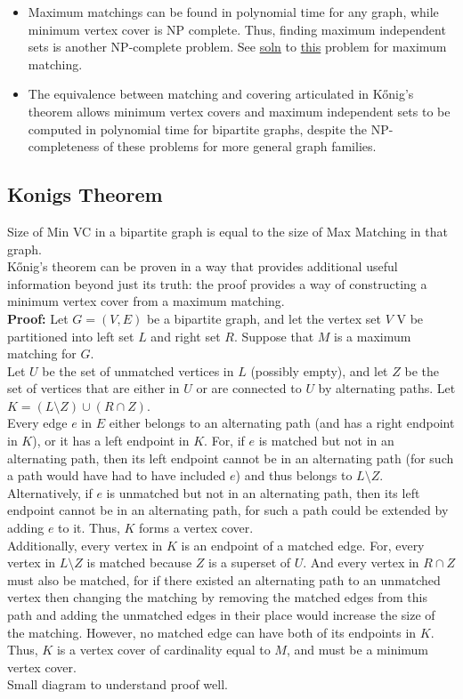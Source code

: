 \documentclass[8pt, a4paper, oneside, twocolumn]{extarticle}
\begin{document}
\begin{itemize}
    \item Maximum matchings can be found in polynomial time for any graph, while minimum vertex cover is NP complete. Thus, finding maximum independent sets is another NP-complete problem. See \href{https://github.com/sourabhxyz/Timus/blob/master/1099_Work_Scheduling.cpp}{soln} to \href{http://acm.timus.ru/problem.aspx?space=1&num=1099}{this} problem for maximum matching.
    \item The equivalence between matching and covering articulated in Kőnig's theorem allows minimum vertex covers and maximum independent sets to be computed in polynomial time for bipartite graphs, despite the NP-completeness of these problems for more general graph families.
\end{itemize}
\subsection{Konigs Theorem}
Size of Min VC in a bipartite graph is equal to the size of Max Matching in that graph.
\\Kőnig's theorem can be proven in a way that provides additional useful information beyond just its truth: the proof provides a way of constructing a minimum vertex cover from a maximum matching.
\\\textbf{Proof: } Let $G = (V, E)$ be a bipartite graph, and let the vertex set $V$ V be partitioned into left set $L$ and right set $R$. Suppose that $M$ is a maximum matching for $G$.
\\Let $U$ be the set of unmatched vertices in $L$ (possibly empty), and let $Z$ be the set of vertices that are either in $U$ or are connected to $U$ by alternating paths. Let $K = ( L \setminus Z ) \cup ( R \cap Z )$. 
\\Every edge $e$ in $E$ either belongs to an alternating path (and has a right endpoint in $K$), or it has a left endpoint in $K$. For, if $e$ is matched but not in an alternating path, then its left endpoint cannot be in an alternating path (for such a path would have had to have included $e$) and thus belongs to $L \setminus Z$. Alternatively, if $e$ is unmatched but not in an alternating path, then its left endpoint cannot be in an alternating path, for such a path could be extended by adding $e$ to it. Thus, $K$ forms a vertex cover.\\
Additionally, every vertex in $K$ is an endpoint of a matched edge. For, every vertex in $L \setminus Z$ is matched because $Z$ is a superset of $U$. And every vertex in $R \cap Z$ must also be matched, for if there existed an alternating path to an unmatched vertex then changing the matching by removing the matched edges from this path and adding the unmatched edges in their place would increase the size of the matching. However, no matched edge can have both of its endpoints in $K$. Thus, $K$ is a vertex cover of cardinality equal to $M$, and must be a minimum vertex cover.
\\Small diagram to understand proof well.
\end{document}
